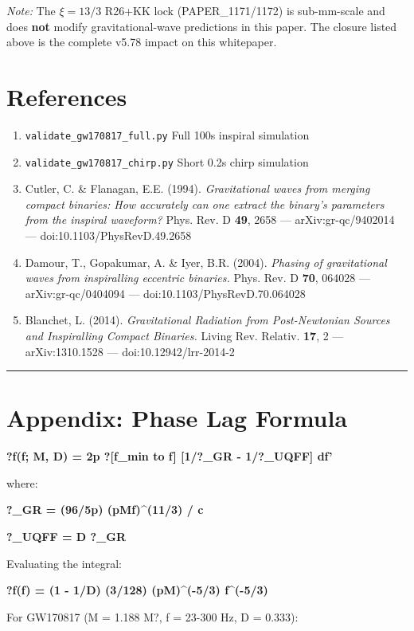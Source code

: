 \documentclass[11pt]{article}
\begin{document}
\emph{Note:} The $\xi=13/3$ R26+KK lock (PAPER\_1171/1172) is sub-mm-scale and does \textbf{not} modify gravitational-wave predictions in this paper. The closure listed above is the complete v5.78 impact on this whitepaper.

\section*{References}

\begin{enumerate}
  \item \verb|validate_gw170817_full.py|  Full 100s inspiral simulation
  \item \verb|validate_gw170817_chirp.py|  Short 0.2s chirp simulation
  \item Cutler, C. \& Flanagan, E.E. (1994). \emph{Gravitational waves from merging compact binaries: How accurately can one extract the binary's parameters from the inspiral waveform?} Phys. Rev. D \textbf{49}, 2658 --- arXiv:gr-qc/9402014 --- doi:10.1103/PhysRevD.49.2658
  \item Damour, T., Gopakumar, A. \& Iyer, B.R. (2004). \emph{Phasing of gravitational waves from inspiralling eccentric binaries.} Phys. Rev. D \textbf{70}, 064028 --- arXiv:gr-qc/0404094 --- doi:10.1103/PhysRevD.70.064028
  \item Blanchet, L. (2014). \emph{Gravitational Radiation from Post-Newtonian Sources and Inspiralling Compact Binaries.} Living Rev. Relativ. \textbf{17}, 2 --- arXiv:1310.1528 --- doi:10.12942/lrr-2014-2
\end{enumerate}

\noindent\rule{\textwidth}{0.4pt}

\section*{Appendix: Phase Lag Formula}

\textbf{?f(f; M, D) = 2p ?[f\_min to f] [1/?\_GR - 1/?\_UQFF] df'}

where:

\textbf{?\_GR = (96/5p) (pMf)\textasciicircum{}(11/3) / c}

\textbf{?\_UQFF = D  ?\_GR}

Evaluating the integral:

\textbf{?f(f) = (1 - 1/D)  (3/128) (pM)\textasciicircum{}(-5/3) f\textasciicircum{}(-5/3)}

For GW170817 (M = 1.188 M?, f = 23-300 Hz, D = 0.333):
\end{document}
